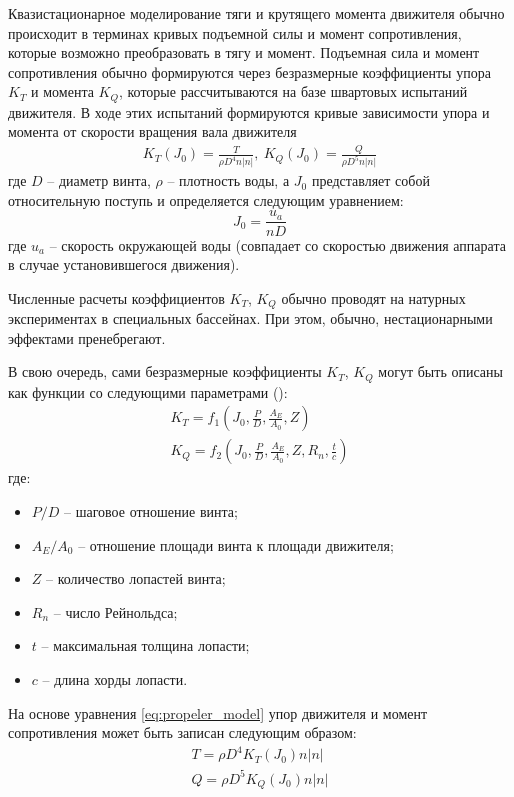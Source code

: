 Квазистационарное моделирование тяги и крутящего момента движителя обычно происходит в терминах кривых подъемной силы и момент сопротивления, которые возможно преобразовать в тягу и момент.
Подъемная сила и момент сопротивления обычно формируются через безразмерные коэффициенты упора $K_T$ и момента $K_Q$, которые рассчитываются на базе швартовых испытаний движителя.
В ходе этих испытаний формируются кривые зависимости упора и момента от скорости вращения вала движителя
\begin{gather}
\label{eq:propeler_model}
    K_T (J_0) = \frac{T}{\rho D^4 n |n|}, \:
    K_Q (J_0) = \frac{Q}{\rho D^5 n |n|}
\end{gather}
\noindent где $D$ -- диаметр винта, $\rho$ -- плотность воды, а $J_0$ представляет собой относительную поступь и определяется следующим уравнением:
\begin{equation}
    J_0 = \frac{u_a}{nD}
\end{equation}
\noindent где $u_a$ -- скорость окружающей воды (совпадает со скоростью движения аппарата в случае установившегося движения).

Численные расчеты коэффициентов $K_T$, $K_Q$ обычно проводят на натурных экспериментах в специальных бассейнах.
При этом, обычно, нестационарными эффектами пренебрегают.

В свою очередь, сами безразмерные коэффициенты $K_T$, $K_Q$ могут быть описаны как функции со следующими параметрами (\cite{oosterveld1975further}):
\begin{gather}
    K_T = f_1 \left( J_0, \frac{P}{D}, \frac{A_E}{A_0}, Z \right) \\
    K_Q = f_2 \left( J_0, \frac{P}{D}, \frac{A_E}{A_0}, Z, R_n, \frac{t}{c} \right) 
\end{gather}
\noindent где:
\begin{itemize}
    \item $P/D$ -- шаговое отношение винта;
    \item $A_E/A_0$ -- отношение площади винта к площади движителя;
    \item $Z$ -- количество лопастей винта;
    \item $R_n$ -- число Рейнольдса;
    \item $t$ -- максимальная толщина лопасти;
    \item $c$ -- длина хорды лопасти.
\end{itemize}

На основе уравнения \ref{eq:propeler_model} упор движителя и момент сопротивления может быть записан следующим образом:
\begin{gather}
    T = \rho D^4K_T(J_0)n|n| \\
    Q = \rho D^5K_Q(J_0)n|n|
\end{gather}

